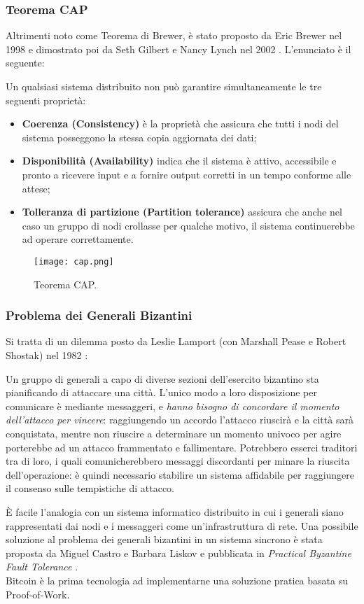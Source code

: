 		\subsubsection{Teorema CAP}\label{sec:teorema_CAP}
			Altrimenti noto come Teorema di Brewer, è stato proposto da Eric Brewer nel 1998 e dimostrato poi da Seth Gilbert e Nancy Lynch nel 2002 \cite{CAP}. L'enunciato è il seguente:
			\begin{displayquote}
				Un qualsiasi sistema distribuito non può garantire simultaneamente le tre seguenti proprietà:
				\begin{itemize}
					\item \textbf{Coerenza (Consistency)} è la proprietà che assicura che tutti i nodi del sistema posseggono la stessa copia aggiornata dei dati;
					\item \textbf{Disponibilità (Availability)} indica che il sistema è attivo, accessibile e pronto a ricevere input e a fornire output corretti in un tempo conforme alle attese;
					\item \textbf{Tolleranza di partizione (Partition tolerance)} assicura che anche nel caso un gruppo di nodi crollasse per qualche motivo, il sistema continuerebbe ad operare correttamente.
				\end{itemize}
			\end{displayquote}
			\begin{figure}[ht]
				\centering
				\texttt{[image: cap.png]}
				\caption[Teorema CAP]{Teorema CAP. \cite{cap_diagram}}
				\label{fig:cap}
			\end{figure}

		\subsubsection{Problema dei Generali Bizantini}
			Si tratta di un dilemma posto da Leslie Lamport (con Marshall Pease e Robert Shostak) nel 1982 \cite{BGP}: 
			\begin{displayquote}
				Un gruppo di generali a capo di diverse sezioni dell'esercito bizantino sta pianificando di attaccare una città. L'unico modo a loro disposizione per comunicare è mediante messaggeri, e \emph{hanno bisogno di concordare il momento dell'attacco per vincere}: raggiungendo un accordo l'attacco riuscirà e la città sarà conquistata, mentre non riuscire a determinare un momento univoco per agire porterebbe ad un attacco frammentato e fallimentare. Potrebbero esserci traditori tra di loro, i quali comunicherebbero messaggi discordanti per minare la riuscita dell'operazione: è quindi necessario stabilire un sistema affidabile per raggiungere il consenso sulle tempistiche di attacco. 
			\end{displayquote}
			È facile l'analogia con un sistema informatico distribuito in cui i generali siano rappresentati dai nodi e i messaggeri come un'infrastruttura di rete. Una possibile soluzione al problema dei generali bizantini in un sistema sincrono è stata proposta da Miguel Castro e Barbara Liskov e pubblicata in \emph{Practical Byzantine Fault Tolerance} \cite{PBFT}. \\
			Bitcoin è la prima tecnologia ad implementarne una soluzione pratica basata su Proof-of-Work.

